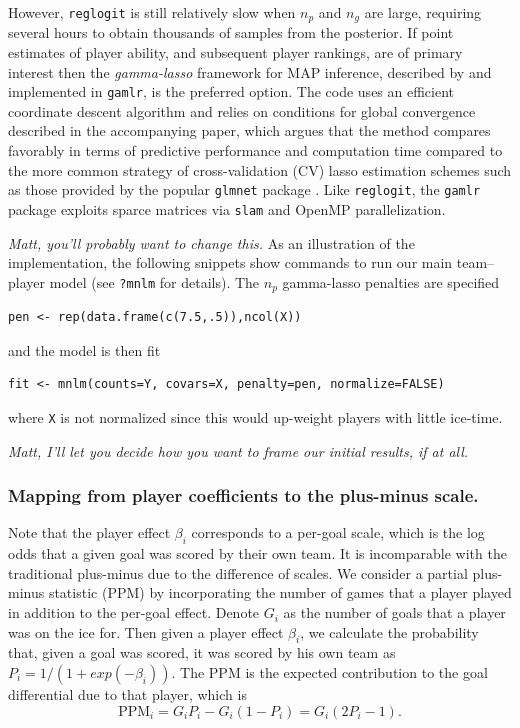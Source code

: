 However, {\tt reglogit} is still relatively slow when $n_p$ and $n_g$ are
large, requiring several hours to obtain thousands of samples from the
posterior.  If point estimates of player ability, and subsequent player
rankings, are of primary interest then the {\em gamma-lasso} framework for MAP
inference, described by \cite{taddy:2012} and implemented in {\tt gamlr}, is
the preferred option. The code uses an efficient coordinate descent algorithm
and relies on conditions for global convergence described in the accompanying
paper, which argues that the method compares favorably in terms of predictive
performance and computation time compared to the more common strategy of
cross-validation (CV) lasso estimation schemes such as those provided by the
popular {\tt glmnet} package
\cite{glmnet}.  Like {\tt reglogit}, the {\tt gamlr} package exploits sparce
matrices via {\tt slam} and OpenMP parallelization.

{\em Matt, you'll probably want to change this.}  As an illustration of the
implementation, the following snippets show commands to run our main
team--player model (see \verb!?mnlm! for details).  
The $n_p$ gamma-lasso penalties are specified 
\begin{verbatim}
pen <- rep(data.frame(c(7.5,.5)),ncol(X))
\end{verbatim}
and the model is then fit
\begin{verbatim}
fit <- mnlm(counts=Y, covars=X, penalty=pen, normalize=FALSE)
\end{verbatim}
where \verb!X! is not normalized since this would up-weight players with little ice-time.

{\em Matt, I'll let you decide how you want to frame our initial results, if at all.}

\subsubsection{Mapping from player coefficients to the plus-minus scale.}
\label{sec:ppm.mapping}
Note that the player effect $\beta_i$ corresponds to a per-goal scale, which is the log odds that a given goal was scored by their own team. It is incomparable with the traditional plus-minus due to the difference of scales. We consider a partial plus-minus statistic (PPM) by incorporating the number of games that a player played in addition to the per-goal effect. Denote $G_i$ as the number of goals that a player was on the ice for. Then given a player effect $\beta_i$, we calculate the probability that, given a goal was scored, it was scored by his own team as $P_i=1/(1+exp(-\beta_i))$. The PPM is the expected contribution to the goal differential due to that player, which is 
\begin{equation}
\text{PPM}_i = G_iP_i-G_i(1-P_i)=G_i(2P_i-1).
\label{eq:ppm}
\end{equation}

